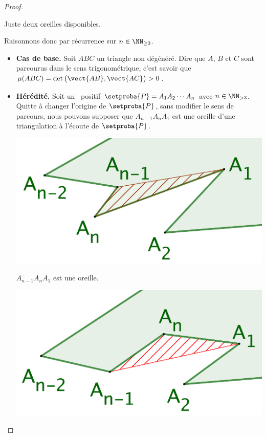 \begin{proof}
\begin{multicols}{2}
\begin{center}
        	\smallskip
       		Juste deux oreilles disponibles.
    	\end{center}
    \end{multicols}

	
	Raisonnons donc par récurrence sur $n \in \NN_{\geq3}$.

	\begin{itemize}
		\item \textbf{Cas de base.}
		Soit $ABC$ un triangle non dégénéré.
		Dire que $A$, $B$ et $C$ sont parcourus dans le sens trigonométrique,
		c'est savoir que $\mu(ABC) = \det \big( \vect{AB} , \vect{AC} \big) > 0$.


		\item \textbf{Hérédité.}
		Soit un \ngone\ positif $\setproba{P} = A_1 A_2 \cdots A_n$ avec $n \in \NN_{>3}$.
		Quitte à changer l'origine de $\setproba{P}$, sans modifier le sens de parcours, nous pouvons supposer que $A_{n-1} A_n A_1$ est une oreille d'une triangulation à l'écoute de $\setproba{P}$.


	    \begin{multicols}{2}
    	    \small\itshape
    		\begin{center}
        	\includegraphics[scale=.175]{content/polygon/alg-area/triangulation-proof-OK.png}

	        	\smallskip
    	   		$A_{n-1} A_n A_1$ est une oreille.
    	\end{center}

	    	\begin{center}
        	\includegraphics[scale=.175]{content/polygon/alg-area/triangulation-proof-KO.png}


\end{center}
\end{multicols}
\end{itemize}
\end{proof}
